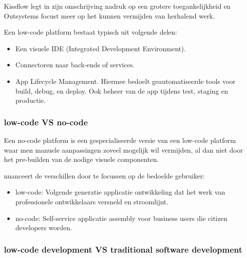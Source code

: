 Kissflow legt in zijn omschrijving nadruk op een grotere toegankelijkheid en Outsystems focust meer op het kunnen vermijden van herhalend werk.

Een low-code platform bestaat typisch uit volgende delen:
\begin{itemize}
    \item Een visuele IDE (Integrated Development Environment).
    \item Connectoren naar back-ends of services.
    \item App Lifecycle Management. Hiermee bedoelt geautomatiseerde tools voor build, debug, en deploy. Ook beheer van de app tijdens test, staging en productie.
\end{itemize} \autocite{Revell2020}

\subsubsection{low-code VS no-code}

Een no-code platform is een gespecialiseerde versie van een low-code platform waar men manuele aanpassingen zoveel mogelijk wil vermijden, al dan niet door het pre-builden van de nodige visuele componenten.

\textcite{Bloomberg2017} nuanceert de verschillen door te focussen op de bedoelde gebruiker:
\begin{itemize}
    \item low-code: Volgende generatie applicatie ontwikkeling dat het werk van professionele ontwikkelaars versneld en stroomlijnt.
    \item no-code: Self-service applicatie assembly voor business users die citizen developers worden.
\end{itemize}

\subsubsection{low-code development VS traditional software development}


